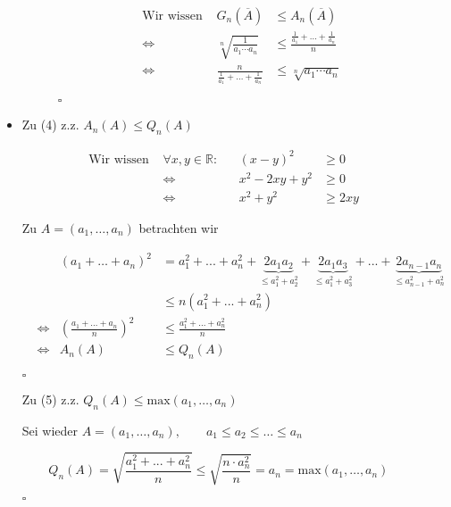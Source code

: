 \documentclass[12pt,a4paper,leqno]{article}
\begin{document}
\begin{description}
\begin{itemize}
\begin{description}
              
              \begin{align*}
                &\textrm{Wir wissen } & G_n(\overline{A}) &\leq A_n(\overline{A}) \\
                &\Leftrightarrow & \sqrt[n]{\scriptstyle \frac{1}{a_1 \cdots a_n}} &\leq 
                \frac{\scriptstyle \frac{1}{a_1} + \ldots + \frac{1}{a_n}}{n} \\
                &\Leftrightarrow & \frac{n}{\scriptstyle \frac{1}{a_1} + \ldots + \frac{1}{a_n}} &\leq \sqrt[n]{a_1 \cdots a_n}
              \end{align*}
              \begin{flushright}$\square$\end{flushright}
          \end{description}
          
        \item[] Zu (4) z.z. $A_n(A) \leq Q_n (A)$
          
          \begin{align*}
            &\textrm{Wir wissen } &\forall x,y \in \mathbb{R}: && (x-y)^2 & \geq 0 \\
            && \Leftrightarrow &&x^2 - 2xy + y^2 &\geq 0 \\
            && \Leftrightarrow &&x^2 + y^2 &\geq 2xy
          \end{align*}
          
          Zu $A=(a_1,\dotsc, a_n)$ betrachten wir
          
          \begin{align*}
            &&(a_1 +\ldots + a_n)^2 &= a_1^2 + ... + a_n^2 + \underbrace{2a_1 a_2}_{\leq a_1^2+a_2^2} + 
            \underbrace{2a_1 a_3}_{\leq a_1^2+a_3^2} + ... + \underbrace{2a_{n-1} a_n}_{\leq a_{n-1}^2+a_n^2} \\
            &&& \leq n ( a_1^2 + ... + a_n^2 ) \\
            &\Leftrightarrow &\left( \frac{a_1 + \ldots + a_n}{n} \right) ^ 2 &\leq \frac{a_1^2 + ... + a_n^2}{n} \\
            &\Leftrightarrow &A_n(A) &\leq Q_n(A)
          \end{align*}
          \begin{flushright}$\square$\end{flushright}
          
          Zu (5) z.z. $Q_n(A) \leq \textrm{max}(a_1,\dotsc, a_n)$
          
          Sei wieder $A = (a_1,\dotsc, a_n) , \qquad a_1 \leq a_2 \leq \ldots \leq a_n$
          
          $$Q_n(A) = \sqrt{\frac{a_1^2 + ... + a_n^2}{n}} \leq \sqrt{\frac{n \cdot a_n^2}{n}} = a_n = \textrm{max}(a_1,\dotsc, a_n)$$
          
          \begin{flushright}$\square$\end{flushright}
      \end{itemize}
  \end{description}
\end{document}
